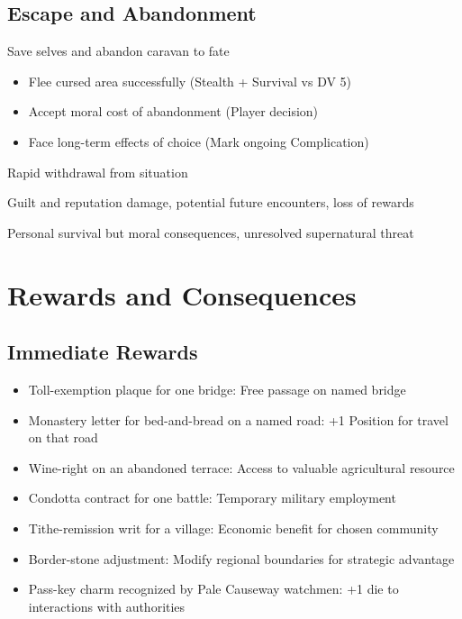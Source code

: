 \documentclass[11pt]{article}
\newenvironment{resolution}[1]{\begin{description}[leftmargin=*,style=standard]\item[\textbf{#1}]}{\end{description}}
\begin{document}
\subsection{Escape and Abandonment}
\begin{resolution}{Escape and Abandonment}
\item[Choice:] Save selves and abandon caravan to fate
\item[Requirements:] 
  \begin{itemize}
    \item Flee cursed area successfully (Stealth + Survival vs DV 5)
    \item Accept moral cost of abandonment (Player decision)
    \item Face long-term effects of choice (Mark ongoing Complication)
  \end{itemize}
\item[Procedure:] Rapid withdrawal from situation
\item[Costs:] Guilt and reputation damage, potential future encounters, loss of rewards
\item[Outcome:] Personal survival but moral consequences, unresolved supernatural threat
\end{resolution}

\section{Rewards and Consequences}

\subsection{Immediate Rewards}
\begin{itemize}
\item Toll-exemption plaque for one bridge: Free passage on named bridge
\item Monastery letter for bed-and-bread on a named road: +1 Position for travel on that road
\item Wine-right on an abandoned terrace: Access to valuable agricultural resource
\item Condotta contract for one battle: Temporary military employment
\item Tithe-remission writ for a village: Economic benefit for chosen community
\item Border-stone adjustment: Modify regional boundaries for strategic advantage
\item Pass-key charm recognized by Pale Causeway watchmen: +1 die to interactions with authorities
\end{itemize}
\end{document}
